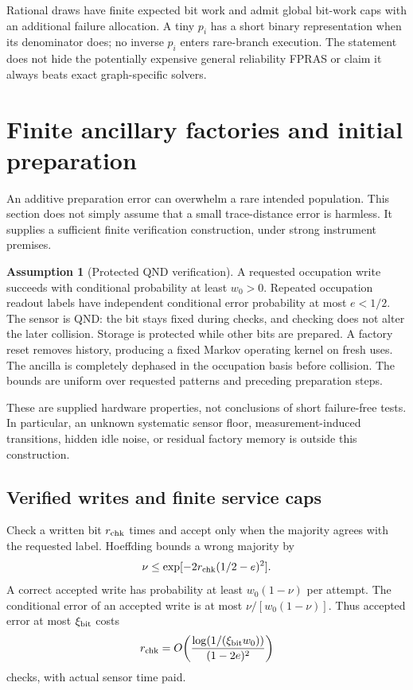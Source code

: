 \documentclass[10pt,a4paper]{article}
\theoremstyle{definition}\newtheorem{assumption}[theorem]{Assumption}
\begin{document}
Rational draws have finite expected bit work and admit global bit-work caps with an additional failure allocation. A tiny $p_i$ has a short binary representation when its denominator does; no inverse $p_i$ enters rare-branch execution. The statement does not hide the potentially expensive general reliability FPRAS or claim it always beats exact graph-specific solvers.

\section{Finite ancillary factories and initial preparation}
\label{sec:factory}

An additive preparation error can overwhelm a rare intended population. This section does not simply assume that a small trace-distance error is harmless. It supplies a sufficient finite verification construction, under strong instrument premises.

\begin{assumption}[Protected QND verification]
\label{ass:qnd}
A requested occupation write succeeds with conditional probability at least $w_0>0$. Repeated occupation readout labels have independent conditional error probability at most $e<1/2$. The sensor is QND: the bit stays fixed during checks, and checking does not alter the later collision. Storage is protected while other bits are prepared. A factory reset removes history, producing a fixed Markov operating kernel on fresh uses. The ancilla is completely dephased in the occupation basis before collision. The bounds are uniform over requested patterns and preceding preparation steps.
\end{assumption}

These are supplied hardware properties, not conclusions of short failure-free tests. In particular, an unknown systematic sensor floor, measurement-induced transitions, hidden idle noise, or residual factory memory is outside this construction.

\subsection{Verified writes and finite service caps}

Check a written bit $r_{\rm chk}$ times and accept only when the majority agrees with the requested label. Hoeffding bounds a wrong majority by
\[
 \nu\le\exp[-2r_{\rm chk}(1/2-e)^2].
\]
A correct accepted write has probability at least $w_0(1-\nu)$ per attempt. The conditional error of an accepted write is at most
$\nu/[w_0(1-\nu)]$. Thus accepted error at most $\xi_{\rm bit}$ costs
\begin{equation}
 r_{\rm chk}=O\!\left(
 \frac{\log(1/(\xi_{\rm bit}w_0))}{(1-2e)^2}\right)
 \label{eq:qndchecks}
\end{equation}
checks, with actual sensor time paid.
\end{document}
